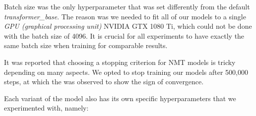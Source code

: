 Batch size was the only hyperparameter that was set differently from the default \textit{transformer\_base}. 
The reason was we needed to fit all of our models to a single \textit{GPU (graphical processing unit)} NVIDIA GTX 1080 Ti, which could not be done with the batch size of 4096. It is crucial for all experiments to have exactly the same batch size when training for comparable results.

It was reported that choosing a stopping criterion for NMT models is tricky \citep{TrainingTipsfortheTransformerModel} depending on many aspects.
We opted to stop training our models after 500,000 steps, at which the \transformerbase was observed to show the sign of convergence.

Each variant of the \transformer model also has its own specific hyperparameters that we experimented with, namely:

